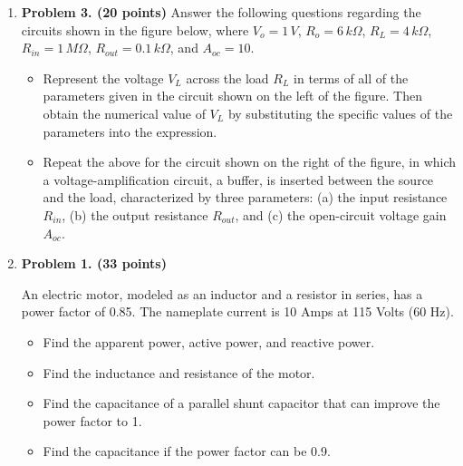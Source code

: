 \begin{enumerate}
\item {\bf Problem 3. (20 points)} 
  Answer the following questions regarding the circuits shown in the figure
  below, where $V_o=1\,V$, $R_o=6\,k\Omega$, $R_L=4\,k\Omega$, 
  $R_{in}=1\,M\Omega$, $R_{out}=0.1\,k\Omega$, and $A_{oc}=10$.
  \begin{itemize}
  \item Represent the voltage $V_L$ across the load $R_L$ in terms of all 
    of the parameters given in the circuit shown on the left of the figure. 
    Then obtain the numerical value of $V_L$ by substituting the specific 
    values of the parameters into the expression.
  \item Repeat the above for the circuit shown on the right of the figure,
    in which a voltage-amplification circuit, a buffer, is inserted between 
    the source and the load, characterized by three parameters: (a) the
    input resistance $R_{in}$, (b) the output resistance $R_{out}$, and 
    (c) the open-circuit voltage gain $A_{oc}$. 
  \end{itemize}





\item {\bf Problem 1. (33 points)} 

  An electric motor, modeled as an inductor and a resistor in series, has 
  a power factor of 0.85. The nameplate current is 10 Amps at 115 Volts 
  (60 Hz). 
  \begin{itemize}
  \item Find the apparent power, active power, and reactive power. 
  \item Find the inductance and resistance of the motor.
  \item Find the capacitance of a parallel shunt capacitor that can improve
    the power factor to 1.
  \item Find the capacitance if the power factor can be 0.9.
  \end{itemize}


\end{enumerate}
